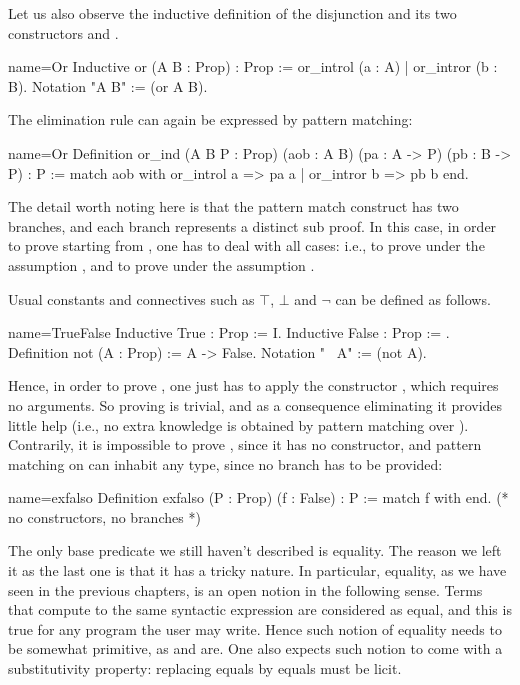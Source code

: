 Let us also observe the inductive definition of the disjunction 
and its two constructors  and .

\begin{coq}{name=Or}{}
Inductive or (A B : Prop) : Prop := or_introl (a : A) | or_intror (b : B).
Notation "A \/ B" := (or A B).
\end{coq}

The elimination rule can again be expressed by pattern matching:

\begin{coq}{name=Or}{}
Definition or_ind (A B P : Prop)
  (aob : A \/ B) (pa : A -> P) (pb : B -> P) : P :=
  match aob with or_introl a => pa a | or_intror b => pb b end.
\end{coq}

The detail worth noting here is that the pattern match construct has two
branches, and each branch represents a distinct sub proof.  In this
case, in order to prove  starting from ,
one has to deal with all cases: i.e., to prove  under the
assumption , and to prove 
under the assumption .

Usual constants and connectives such as $\top$, $\bot$ and $\neg$
can be defined as follows.

\begin{coq}{name=TrueFalse}{}
Inductive True : Prop := I.
Inductive False : Prop := .
Definition not (A : Prop) := A -> False.
Notation "~ A" := (not A).
\end{coq}

Hence, in order to prove , one just has to apply the
constructor , which requires no arguments.
So proving  is trivial, and as a consequence eliminating it
provides little help (i.e., no extra knowledge is obtained by pattern matching
over ).  Contrarily, it is impossible to prove , since it has no
constructor, and pattern matching on  can inhabit any type, since no
branch has to be provided:

\begin{coq}{name=exfalso}{}
Definition exfalso (P : Prop) (f : False) : P :=
  match f with end.  (* no constructors, no branches *)
\end{coq}

The only base predicate we still haven't described is equality.  The reason we
left it as the last one is that it has a tricky nature.  In particular,
equality, as we have seen in the previous chapters, is an open notion
in the following sense.  Terms that compute to the same syntactic expression
are considered as equal, and this is true for any program the user may write.
Hence such notion of equality needs to be somewhat primitive, as
 and  are.  One also expects such notion to come
with a substitutivity property: replacing equals by equals must be licit.

